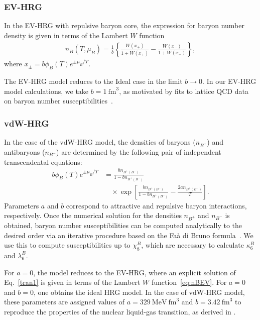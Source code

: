 \documentclass[%
 reprint,
nofootinbib,
 amsmath,amssymb,
 aps,
prc
]{revtex4-2}
\begin{document}
\subsubsection{EV-HRG}

In the EV-HRG with repulsive baryon core, the expression for baryon number density is given in terms of the Lambert $W$ function~\cite{Noronha-Hostler:2012ycm,Taradiy:2019taz}
\begin{align}
n_B(T,\mu_B) = \frac{1}{b} \left\{ \frac{W(x_+)}{1 + W(x_+)} - \frac{W(x_-)}{1 + W(x_-)}  \right\},
\label{eq:nBEV}
\end{align}
where $x_\pm = b \phi_B(T) e^{\pm \mu_B/T}$.

The EV-HRG model reduces to the Ideal case in the limit $b \to 0$.
In our EV-HRG model calculations, we take $b=1~\text{fm}^3$, as motivated by fits to lattice QCD data on baryon number susceptibilities~\cite{Karthein:2021cmb}.

\subsubsection{vdW-HRG}

In the case of the vdW-HRG model, the densities of baryons ($n_{B^+}$) and antibaryons ($n_{B^-}$) are determined by the following pair of independent transcendental equations:
\begin{align}
      b \phi_B(T) e^{\pm\mu_B/T} & = \frac{b n_{B^+(B^-)}}{1-bn_{B^+(B^-)}} \nonumber \\
      & \quad \times \exp\left[\frac{bn_{B^+(B^-)}}{1-bn_{B^+(B^-)}} - \frac{2an_{B^+(B^-)}}{T}\right].
    \label{tran1}
\end{align}
Parameters $a$ and $b$ correspond to attractive and repulsive baryon interactions, 
respectively. 
Once the numerical solution for the densities $n_{B^+}$ and $n_{B^-}$ is obtained, baryon number susceptibilities can be computed analytically to the desired order via an iterative procedure based on the Fa\`a di Bruno formula~\cite{Savchuk:2019yxl}.
We use this to compute susceptibilities up to $\chi_8^B$, which are necessary to calculate $\kappa_6^B$ and $\lambda_6^B$.

For $a = 0$, the model reduces to the EV-HRG, where an explicit solution of Eq.~\eqref{tran1} is given in terms of the Lambert $W$ function~\eqref{eq:nBEV}.
For $a = 0$ and $b = 0$, one obtains the ideal HRG model.
In the case of vdW-HRG model, these parameters are assigned values of $a=329  ~\text{MeV} ~ \text{fm}^3$ and $b=3.42~\text{fm}^3$ to reproduce the properties of the nuclear liquid-gas transition, as derived in \cite{Vovchenko:2015vxa,Sanzhur:2022jxx}. 
\end{document}
